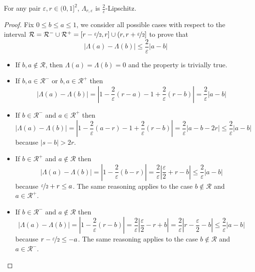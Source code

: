 \documentclass[final,12pt]{colt2025}
\newcommand{\e}{\varepsilon}
\newcommand{\nb}{b}
\newcommand{\ns}{a}
\begin{document}
\begin{lemma}\label{lemma:lambdalipschitz}
    For any pair $\e, r \in (0, 1]^2$, $\Lambda_{r, \e}$ is $\frac{2}{\e}$-Lipschitz.
\end{lemma}
\begin{proof}
    Fix $0 \le \nb \le \ns \le 1$, we consider all possible cases with respect to the interval $\mathcal{R} = \mathcal{R}^- \cup \mathcal{R}^+ = [ r - \nicefrac{\e}{2}, r] \cup (r, r + \nicefrac{\e}{2}]$ to prove that
    \[
        | \Lambda(\ns) - \Lambda(\nb) | \le \frac{2}{\e} |\ns - \nb|
    \]
    \begin{itemize}
        \item If $\nb, \ns \notin \mathcal{R}$, then $\Lambda(\ns) = \Lambda(\nb) = 0$ and the property is trivially true. 
        \item If $\nb, \ns \in \mathcal{R}^-$ or $\nb, \ns \in \mathcal{R}^+$ then
        \[
            |\Lambda(\ns) - \Lambda(\nb)|
            = \left| 1 - \frac{2}{\e}(r - \ns) - 1 + \frac{2}{\e}(r - \nb) \right|
            = \frac{2}{\e} \left| \ns - \nb \right|
        \]
        \item If $\nb \in \mathcal{R}^-$ and $\ns \in \mathcal{R}^+$ then
        \[
            |\Lambda(\ns) - \Lambda(\nb)|
            = \left| 1 - \frac{2}{\e}(\ns - r) - 1 + \frac{2}{\e}(r - \nb) \right|
            = \frac{2}{\e} \left| \ns - \nb - 2r \right|
            \le \frac{2}{\e} \left| \ns - \nb \right|
        \]
        because $|s - b| > 2r$.
        \item If $\nb \in \mathcal{R}^+$ and $\ns \notin \mathcal{R}$ then
        \[
            |\Lambda(\ns) - \Lambda(\nb)|
            = \left| 1 - \frac{2}{\e}(\nb - r) \right|
            = \frac{2}{\e} \left| \frac{\e}{2} + r - \nb \right|
            \le \frac{2}{\e} | \ns - \nb |
        \]
        because $\nicefrac{\e}{2} + r \le \ns$. The same reasoning applies to the case $\nb \notin \mathcal{R}$ and $\ns \in \mathcal{R}^+$.
        \item If $\nb \in \mathcal{R}^-$ and $\ns \notin \mathcal{R}$ then
        \[
            |\Lambda(\ns) - \Lambda(\nb)|
            = \left| 1 - \frac{2}{\e}(r - \nb) \right|
            = \frac{2}{\e} \left| \frac{\e}{2} - r + \nb \right|
            = \frac{2}{\e} \left| r - \frac{\e}{2} - \nb \right|
            \le \frac{2}{\e} | \ns - \nb |
        \]
        because $r - \nicefrac{\e}{2} \le - \ns$. The same reasoning applies to the case $b \notin \mathcal{R}$ and $\ns \in \mathcal{R}^-$.
    \end{itemize}
\end{proof}
\end{document}
